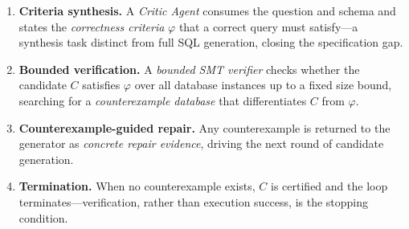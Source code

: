 \documentclass{article}
\begin{document}
\begin{enumerate}
  \item \textbf{Criteria synthesis.} A \emph{Critic Agent} consumes the
        question and schema and states the \emph{correctness criteria}
        $\varphi$ that a correct query must satisfy---a synthesis task distinct
        from full SQL generation, closing the specification gap.
  \item \textbf{Bounded verification.} A \emph{bounded SMT verifier} checks
        whether the candidate $C$ satisfies $\varphi$ over all database
        instances up to a fixed size bound, searching for a
        \emph{counterexample database} that differentiates $C$ from $\varphi$.
  \item \textbf{Counterexample-guided repair.} Any counterexample is returned
        to the generator as \emph{concrete repair evidence}, driving the next
        round of candidate generation.
  \item \textbf{Termination.} When no counterexample exists, $C$ is certified
        and the loop terminates---verification, rather than execution success,
        is the stopping condition.
\end{enumerate}
\end{document}
